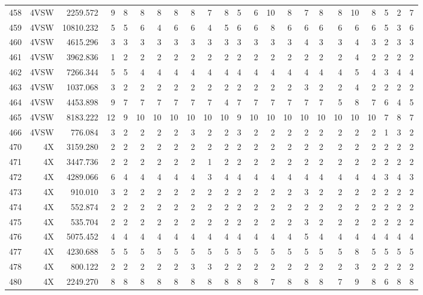 \documentclass[12pt]{article}\usepackage[]{graphicx}\usepackage[]{color}
\begin{document}
\begin{landscapepage}
\begin{longtable}[t]{crrrrrrrrrrrrrrrcrrrrrr}
458 & 4VSW & 2259.572 & 9 & 8 & 8 & 8 & 8 & 8 & 7 & 8 & 5 & 6 & 10 & 8 & 7 & 8 & 8 & 10 & 8 & 5 & 2 & 7\\
459 & 4VSW & 10810.232 & 5 & 5 & 6 & 4 & 6 & 6 & 4 & 5 & 6 & 6 & 8 & 6 & 6 & 6 & 6 & 6 & 6 & 5 & 3 & 6\\
460 & 4VSW & 4615.296 & 3 & 3 & 3 & 3 & 3 & 3 & 3 & 3 & 3 & 3 & 3 & 3 & 4 & 3 & 3 & 4 & 3 & 2 & 3 & 3\\
461 & 4VSW & 3962.836 & 1 & 2 & 2 & 2 & 2 & 2 & 2 & 2 & 2 & 2 & 2 & 2 & 2 & 2 & 2 & 4 & 2 & 2 & 2 & 2\\
462 & 4VSW & 7266.344 & 5 & 5 & 4 & 4 & 4 & 4 & 4 & 4 & 4 & 4 & 4 & 4 & 4 & 4 & 4 & 5 & 4 & 3 & 4 & 4\\
463 & 4VSW & 1037.068 & 3 & 2 & 2 & 2 & 2 & 2 & 2 & 2 & 2 & 2 & 2 & 2 & 3 & 2 & 2 & 4 & 2 & 2 & 2 & 2\\
464 & 4VSW & 4453.898 & 9 & 7 & 7 & 7 & 7 & 7 & 7 & 4 & 7 & 7 & 7 & 7 & 7 & 7 & 5 & 8 & 7 & 6 & 4 & 5\\
465 & 4VSW & 8183.222 & 12 & 9 & 10 & 10 & 10 & 10 & 10 & 10 & 9 & 10 & 10 & 10 & 10 & 10 & 10 & 10 & 10 & 7 & 8 & 7\\
466 & 4VSW & 776.084 & 3 & 2 & 2 & 2 & 2 & 3 & 2 & 2 & 3 & 2 & 2 & 2 & 2 & 2 & 2 & 2 & 2 & 1 & 3 & 2\\
470 & 4X & 3159.280 & 2 & 2 & 2 & 2 & 2 & 2 & 2 & 2 & 2 & 2 & 2 & 2 & 2 & 2 & 2 & 2 & 2 & 2 & 2 & 2\\
471 & 4X & 3447.736 & 2 & 2 & 2 & 2 & 2 & 2 & 1 & 2 & 2 & 2 & 2 & 2 & 2 & 2 & 2 & 2 & 2 & 2 & 2 & 2\\
472 & 4X & 4289.066 & 6 & 4 & 4 & 4 & 4 & 4 & 3 & 4 & 4 & 4 & 4 & 4 & 4 & 4 & 4 & 4 & 4 & 3 & 4 & 3\\
473 & 4X & 910.010 & 3 & 2 & 2 & 2 & 2 & 2 & 2 & 2 & 2 & 2 & 2 & 2 & 3 & 2 & 2 & 2 & 2 & 2 & 2 & 2\\
474 & 4X & 552.874 & 2 & 2 & 2 & 2 & 2 & 2 & 2 & 2 & 2 & 2 & 2 & 2 & 2 & 2 & 2 & 2 & 2 & 2 & 2 & 2\\
475 & 4X & 535.704 & 2 & 2 & 2 & 2 & 2 & 2 & 2 & 2 & 2 & 2 & 2 & 2 & 3 & 2 & 2 & 2 & 2 & 2 & 2 & 2\\
476 & 4X & 5075.452 & 4 & 4 & 4 & 4 & 4 & 4 & 4 & 4 & 4 & 4 & 4 & 4 & 5 & 4 & 4 & 4 & 4 & 4 & 4 & 4\\
477 & 4X & 4230.688 & 5 & 5 & 5 & 5 & 5 & 5 & 5 & 5 & 5 & 5 & 5 & 5 & 5 & 5 & 5 & 8 & 5 & 5 & 5 & 5\\
478 & 4X & 800.122 & 2 & 2 & 2 & 2 & 2 & 3 & 3 & 2 & 2 & 2 & 2 & 2 & 2 & 2 & 2 & 3 & 2 & 2 & 2 & 2\\
480 & 4X & 2249.270 & 8 & 8 & 8 & 8 & 8 & 8 & 8 & 8 & 8 & 8 & 7 & 8 & 8 & 8 & 7 & 9 & 8 & 6 & 8 & 8\\

\end{longtable}
\end{landscapepage}
\end{document}
